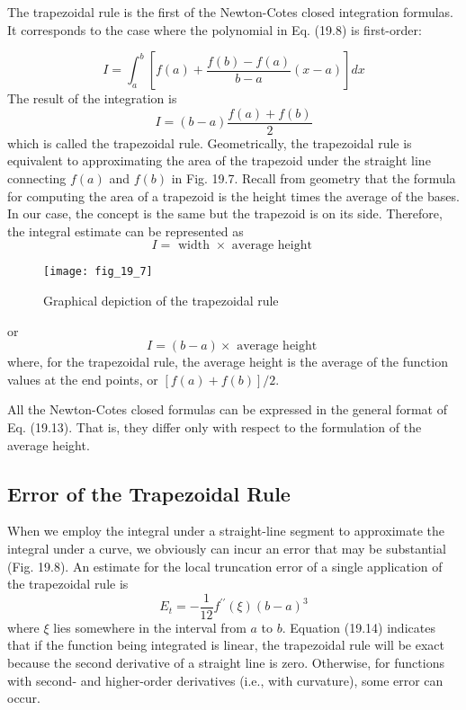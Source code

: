\documentclass[../main.tex]{subfiles}
\begin{document}
The trapezoidal rule is the first of the Newton-Cotes closed integration formulas. It corresponds to the case where the polynomial in Eq. (19.8) is first-order:

\begin{equation}
    \tag{19.10}
I=\int_{a}^{b}\left[f(a)+\frac{f(b)-f(a)}{b-a}(x-a)\right] d x
\end{equation}
The result of the integration is
\begin{equation}
    \tag{19.11}
I=(b-a) \frac{f(a)+f(b)}{2}
\end{equation}
which is called the trapezoidal rule.
Geometrically, the trapezoidal rule is equivalent to approximating the area of the trapezoid under the straight line connecting $f(a)$ and $f(b)$ in Fig. 19.7. Recall from geometry that the formula for computing the area of a trapezoid is the height times the average of the bases. In our case, the concept is the same but the trapezoid is on its side. Therefore, the integral estimate can be represented as
\begin{equation}
    \tag{19.12}
I=\text { width } \times \text { average height }
\end{equation}

\begin{figure}[H]
    \centering
    \texttt{[image: fig\_19\_7]}
   \caption{\textsf{Graphical depiction of the trapezoidal rule}}\label{fig:fig_19_7}
\end{figure}
or
\begin{equation}
    \tag{19.13}
	I=(b-a) \times \text { average height }
\end{equation}
where, for the trapezoidal rule, the average height is the average of the function values at the end points, or $[f(a)+f(b)] / 2$.

All the Newton-Cotes closed formulas can be expressed in the general format of Eq. (19.13). That is, they differ only with respect to the formulation of the average height.
\subsection{Error of the Trapezoidal Rule}
When we employ the integral under a straight-line segment to approximate the integral under a curve, we obviously can incur an error that may be substantial (Fig. 19.8). An estimate for the local truncation error of a single application of the trapezoidal rule is
\begin{equation}
    \tag{19.14}
E_{t}=-\frac{1}{12} f^{\prime \prime}(\xi)(b-a)^{3}
\end{equation}
where $\xi$ lies somewhere in the interval from $a$ to $b$. Equation (19.14) indicates that if the function being integrated is linear, the trapezoidal rule will be exact because the second derivative of a straight line is zero. Otherwise, for functions with second- and higher-order derivatives (i.e., with curvature), some error can occur.
\end{document}
